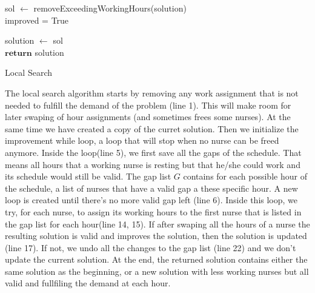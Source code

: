 \begin{algorithm}[H]


sol $\leftarrow$ removeExceedingWorkingHours(solution) \\
improved = True \\


solution $\leftarrow$ sol\\
$\textbf{return}$ solution
\caption{Local Search}\label{alg.mainLoop}
\end{algorithm}

The local search algorithm starts by removing any work assignment that is not needed to fulfill the demand of the problem (line 1). This will make room for later swaping of hour assignments (and sometimes frees some nurses). At the same time we have created a copy of the curret solution. Then we initialize the improvement while loop, a loop that will stop when no nurse can be freed anymore. Inside the loop(line 5), we first save all the gaps of the schedule. That means all hours that a working nurse is resting but that he/she could work and its schedule would still be valid. The gap list $G$ contains for each possible hour of the schedule, a list of nurses that have a valid gap a these specific hour. A new loop is created until there's no more valid gap left (line 6). Inside this loop, we try, for each nurse, to assign its working hours to the first nurse that is listed in the gap list for each hour(line 14, 15).  
If after swaping all the hours of a nurse the resulting solution is valid and improves the solution, then the solution is updated (line 17). If not, we undo all the changes to the gap list (line 22) and we don't update the current solution. At the end, the returned solution contains either the same solution as the beginning, or a new solution with less working nurses but all valid and fullfiling the demand at each hour.


